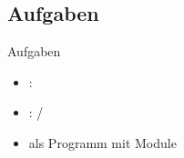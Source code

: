 \subsection{Aufgaben}
\begin{frame}{Aufgaben}
 \begin{itemize}
  \item {}:  
  \item {}: /
  \item {} als \cpp Programm mit Module 
 \end{itemize}
\end{frame}
